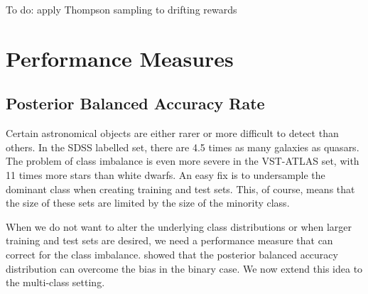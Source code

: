 To do: apply Thompson sampling to drifting rewards \cite{gupta11}


\section{Performance Measures}
\label{sec:measures}

\subsection{Posterior Balanced Accuracy Rate}
Certain astronomical objects are either rarer or more difficult to detect than others.
In the SDSS labelled set, there are 4.5 times as many galaxies as quasars. The problem
of class imbalance is even more severe in the VST-ATLAS set, with 11 times more stars than
white dwarfs. An easy fix is to undersample the dominant class when creating training and
test sets. This, of course, means that the size of these sets are limited by the size
of the minority class.

When we do not want to alter the underlying class distributions or when larger training and test
sets are desired, we need a performance measure that can correct for the class imbalance.
 showed that the posterior balanced accuracy distribution can overcome
the bias in the binary case. We now extend this idea to the multi-class setting.

